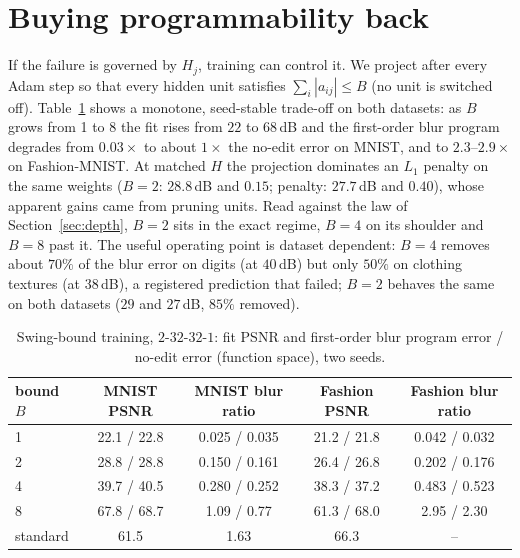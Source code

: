\documentclass[11pt]{article}
\begin{document}
\section{Buying programmability back}
\label{sec:editable}
If the failure is governed by $H_j$, training can control it. We project after every Adam step so that every hidden unit satisfies $\sum_i|a_{ij}|\le B$ (no unit is switched off). Table~\ref{tab:editable} shows a monotone, seed-stable trade-off on both datasets: as $B$ grows from 1 to 8 the fit rises from $22$ to $68$\,dB and the first-order blur program degrades from $0.03\times$ to about $1\times$ the no-edit error on MNIST, and to $2.3$--$2.9\times$ on Fashion-MNIST. At matched $H$ the projection dominates an $L_1$ penalty on the same weights ($B=2$: $28.8$\,dB and $0.15$; penalty: $27.7$\,dB and $0.40$), whose apparent gains came from pruning units. Read against the law of Section~\ref{sec:depth}, $B=2$ sits in the exact regime, $B=4$ on its shoulder and $B=8$ past it. The useful operating point is dataset dependent: $B=4$ removes about $70\%$ of the blur error on digits (at $40$\,dB) but only $50\%$ on clothing textures (at $38$\,dB), a registered prediction that failed; $B=2$ behaves the same on both datasets ($29$ and $27$\,dB, $85\%$ removed).

\begin{table}[t]\centering\small
\caption{Swing-bound training, $2$-$32$-$32$-$1$: fit PSNR and first-order blur program error / no-edit error (function space), two seeds.}
\label{tab:editable}
\begin{tabular}{lcccc}\toprule
bound $B$ & MNIST PSNR & MNIST blur ratio & Fashion PSNR & Fashion blur ratio\\\midrule
1 & 22.1 / 22.8 & 0.025 / 0.035 & 21.2 / 21.8 & 0.042 / 0.032\\
2 & 28.8 / 28.8 & 0.150 / 0.161 & 26.4 / 26.8 & 0.202 / 0.176\\
4 & 39.7 / 40.5 & 0.280 / 0.252 & 38.3 / 37.2 & 0.483 / 0.523\\
8 & 67.8 / 68.7 & 1.09 / 0.77 & 61.3 / 68.0 & 2.95 / 2.30\\
standard & 61.5 & 1.63 & 66.3 & --\\\bottomrule
\end{tabular}
\end{table}
\end{document}
